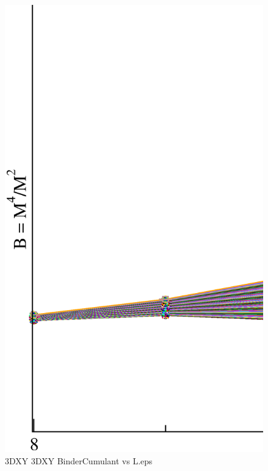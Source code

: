 \begin{figure}[!htpb]
  \centering
  \includegraphics[width=\textwidth]{./plots/3DXY/3DXY_BinderCumulant_vs_L.eps}
  \caption{3DXY 3DXY BinderCumulant vs L.eps}
\end{figure}

